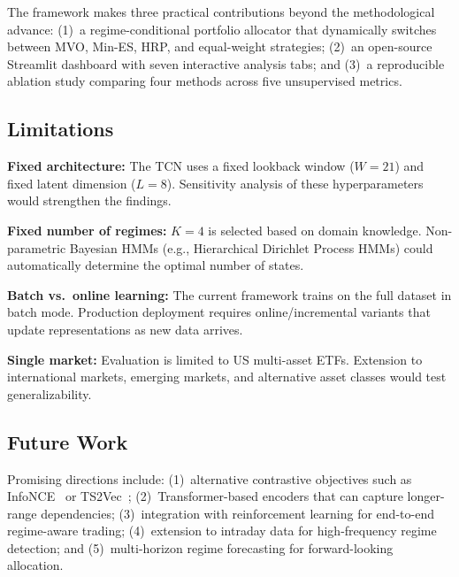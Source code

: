 The framework makes three practical contributions beyond the methodological advance: (1)~a regime-conditional portfolio allocator that dynamically switches between MVO, Min-ES, HRP, and equal-weight strategies; (2)~an open-source Streamlit dashboard with seven interactive analysis tabs; and (3)~a reproducible ablation study comparing four methods across five unsupervised metrics.

\subsection{Limitations}

\textbf{Fixed architecture:} The TCN uses a fixed lookback window ($W\!=\!21$) and fixed latent dimension ($L\!=\!8$). Sensitivity analysis of these hyperparameters would strengthen the findings.

\textbf{Fixed number of regimes:} $K\!=\!4$ is selected based on domain knowledge. Non-parametric Bayesian HMMs (e.g., Hierarchical Dirichlet Process HMMs) could automatically determine the optimal number of states.

\textbf{Batch vs.\ online learning:} The current framework trains on the full dataset in batch mode. Production deployment requires online/incremental variants that update representations as new data arrives.

\textbf{Single market:} Evaluation is limited to US multi-asset ETFs. Extension to international markets, emerging markets, and alternative asset classes would test generalizability.

\subsection{Future Work}

Promising directions include: (1)~alternative contrastive objectives such as InfoNCE~\cite{oord2018} or TS2Vec~\cite{yue2022}; (2)~Transformer-based encoders that can capture longer-range dependencies; (3)~integration with reinforcement learning for end-to-end regime-aware trading; (4)~extension to intraday data for high-frequency regime detection; and (5)~multi-horizon regime forecasting for forward-looking allocation.

